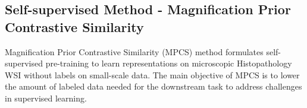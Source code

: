 \documentclass[conference]{IEEEtran}
\begin{document}
\subsection{Self-supervised Method - Magnification Prior Contrastive Similarity} \label{ssl}
\begin{comment}
Recent advances in Contrastive Joint Embedding Embedding Architecture \& Method (JEAM) SimCLR~\cite{chen2020simple}-\cite{chen2020big}, and other methods are robust for representation learning and obtaining state-of-the-art performance.
This work hypothesizes that inducted humans prior suppress the potential of networks to learn in a self-supervised manner more independently towards imitating biological intelligence.
The limitation imposed due to the needs of strong human prior is more recognizable considering beyond the natural visual concept based domains like medical imaging, microscopic images of pathology, and others.
Human knowledge and perception of such domains are relatively limited and fail to compile domain-specific characteristics to create effective transformations for distorted views.
Specifically, BreakHis dataset~\cite{spanhol2016dataset} contains Whole Slide Images (WSI) of four magnifications and affected regions present only on some parts of WSI.
Further, the affected region is not necessarily located in the center of WSI.
Applying transformations from natural visual concept domains to BreakHis does not tend to learn optimal representations because visual and textural properties are very different, including location, size, shape, background-foreground, and concrete definition of objects.
Thus network needs to learn representations by self-attention on affected regions across magnifications that are invariant to location, global context, \& several other geometric characteristics.
So stronger human prior prevents networks from learning and focusing on self-attention.  

Knowing the fact from the literature that human-prior is required for the current state of self-supervised methods, this work focuses on i) exploiting self-supervision signal \& prior from data, i.e., magnification factor to reduce the human prior, and  ii) enabling representation learning on small-scale dataset~\cite{spanhol2016dataset} by utilizing transfer learning and using augmentation based transformation in a specific arrangement.
\end{comment}
Magnification Prior Contrastive Similarity (MPCS) method formulates self-supervised pre-training to learn representations on microscopic Histopathology WSI without labels on small-scale data. The main objective of MPCS is to lower the amount of labeled data needed for the downstream task to address challenges in supervised learning. 
\end{document}
